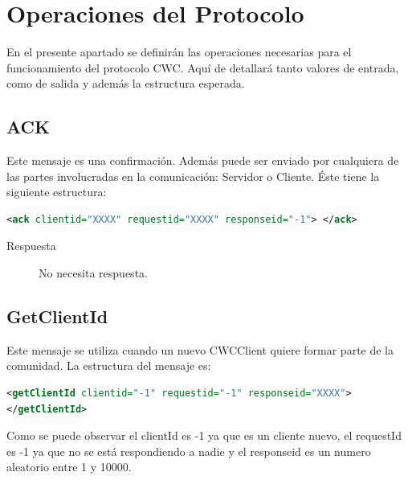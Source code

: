
\section{Operaciones del Protocolo}

En el presente apartado se definirán las operaciones necesarias para el funcionamiento del protocolo CWC. Aquí de detallará tanto valores de entrada, como de salida y además la estructura esperada. 


\subsection{ACK}

Este mensaje es una confirmación. Además puede ser enviado por cualquiera de las partes involucradas en la comunicación: Servidor o Cliente. Éste tiene la siguiente estructura:

\begin{lstlisting}[language=XML,caption=Mensaje ACK]
<ack clientid="XXXX" requestid="XXXX" responseid="-1"> </ack>
\end{lstlisting}

\begin{description}
\item[Respuesta] No necesita respuesta.
\end{description}


\subsection{GetClientId}

Este mensaje se utiliza cuando un nuevo CWCClient quiere formar parte de la comunidad. La estructura del mensaje es:

\begin{lstlisting}[language=XML,caption=Mensaje GetClientId]
<getClientId clientid="-1" requestid="-1" responseid="XXXX"> 
</getClientId>
\end{lstlisting}


Como se puede observar el clientId es -1 ya que es un cliente nuevo, el requestId es -1 ya que no se está respondiendo a nadie y el responseid es un numero aleatorio entre 1 y 10000. 


